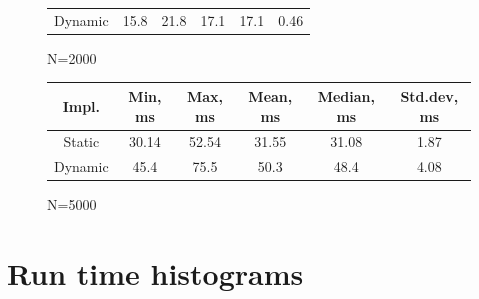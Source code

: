 \documentclass[a4paper,11pt]{article}
\begin{document}
\begin{appendices}
\begin{figure}[H]
\begin{tabular}{c|c|c|c|c|c}
                \hline
                Dynamic & 15.8 & 21.8 & 17.1 & 17.1 & 0.46 \\
            \end{tabular}
            \caption{N=2000}
        \end{figure}
        \begin{figure}[H]
            \centering
            \begin{tabular}{c|c|c|c|c|c}
                Impl. & Min, ms & Max, ms & Mean, ms & Median, ms & Std.dev, ms \\
                \hline
                \hline
                Static & 30.14 & 52.54 & 31.55 & 31.08 & 1.87 \\
                \hline
                Dynamic & 45.4 & 75.5 & 50.3 & 48.4 & 4.08 \\
            \end{tabular}
            \caption{N=5000}
        \end{figure}

        \section{Run time histograms}
        \label{appendix:histos}


\end{appendices}
\end{document}
